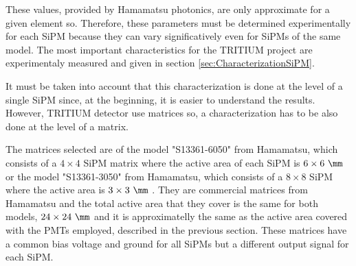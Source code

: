 These values, provided by Hamamatsu photonics, are only approximate for a given element so. Therefore, these parameters must be determined experimentally for each SiPM because they can vary significatively even for SiPMs of the same model. The most important characteristics for the TRITIUM project are experimentaly measured and given in section \ref{sec:CharacterizationSiPM}. 

It must be taken into account that this characterization is done at the level of a single SiPM since, at the beginning, it is easier to understand the results. However, TRITIUM detector use matrices so, a characterization has to be also done at the level of a matrix. 

The matrices selected are of the model "S13361-6050" from Hamamatsu, which consists of a $4\times 4$ SiPM matrix where the active area of each SiPM is $6\times 6~\mm$ \cite{DataSheetHammamatsu_array_SiPM_6050} or the model "S13361-3050" from Hamamatsu, which consists of a $8\times 8$ SiPM where the active area is $3\times 3~\mm$ \cite{DataSheetHammamatsu_array_SiPM_3050}. They are commercial matrices from Hamamatsu and the total active area that they cover is the same for both models, $24\times 24~\mm$ and it is approximatelly the same as the active area covered with the PMTs employed, described in the previous section. These matrices have a common bias voltage and ground for all SiPMs but a different output signal for each SiPM. 

